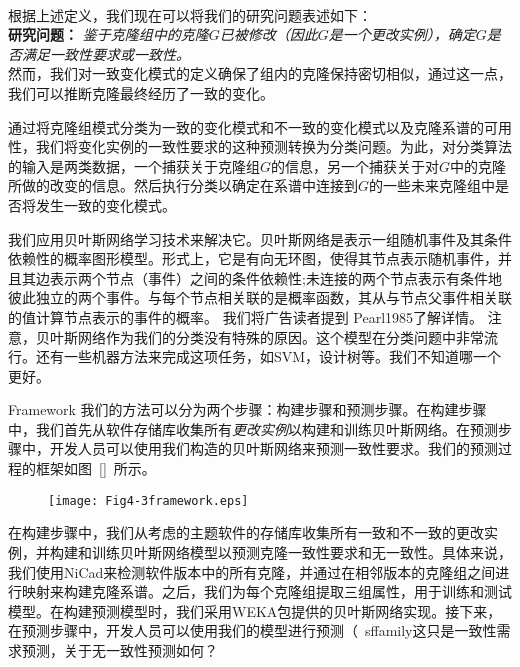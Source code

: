 ~\\
根据上述定义，我们现在可以将我们的研究问题表述如下：\\

\noindent
\textbf {研究问题：} {\em 鉴于克隆组中的克隆$ G $已被修改（因此$ G $是一个更改实例），确定$ G $是否满足一致性要求或一致性。 } \\

然而，我们对一致变化模式的定义确保了组内的克隆保持密切相似，通过这一点，我们可以推断克隆最终经历了一致的变化。

通过将克隆组模式分类为一致的变化模式和不一致的变化模式以及克隆系谱的可用性，我们将变化实例的一致性要求的这种预测转换为分类问题。为此，对分类算法的输入是两类数据，一个捕获关于克隆组$ G $的信息，另一个捕获关于对$ G $中的克隆所做的改变的信息。然后执行分类以确定在系谱中连接到$ G $的一些未来克隆组中是否将发生一致的变化模式。

我们应用贝叶斯网络学习技术来解决它。贝叶斯网络是表示一组随机事件及其条件依赖性的概率图形模型。形式上，它是有向无环图，使得其节点表示随机事件，并且其边表示两个节点（事件）之间的条件依赖性;未连接的两个节点表示有条件地彼此独立的两个事件。与每个节点相关联的是概率函数，其从与节点父事件相关联的值计算节点表示的事件的概率。
我们将广告读者提到\cite{} {Pearl1985}了解详情。 {注意，贝叶斯网络作为我们的分类没有特殊的原因。这个模型在分类问题中非常流行。还有一些机器方法来完成这项任务，如SVM，设计树等。我们不知道哪一个更好。 }

 {Framework}
我们的方法可以分为两个步骤：构建步骤和预测步骤。在构建步骤中，我们首先从软件存储库收集所有{\em 更改实例}以构建和训练贝叶斯网络。在预测步骤中，开发人员可以使用我们构造的贝叶斯网络来预测一致性要求。我们的预测过程的框架如图~\ref{}~所示。

\begin{figure}[htbp]
\centering
\texttt{[image: Fig4-3framework.eps]}
\vspace{-1em}
\end{figure}

在构建步骤中，我们从考虑的主题软件的存储库收集所有一致和不一致的更改实例，并构建和训练贝叶斯网络模型以预测克隆一致性要求和无一致性。具体来说，我们使用NiCad来检测软件版本中的所有克隆，并通过在相邻版本的克隆组之间进行映射来构建克隆系谱。之后，我们为每个克隆组提取三组属性，用于训练和测试模型。在构建预测模型时，我们采用WEKA包提供的贝叶斯网络实现。接下来，在预测步骤中，开发人员可以使用我们的模型进行预测{（{\ sffamily这只是一致性需求预测，关于无一致性预测如何？}}

